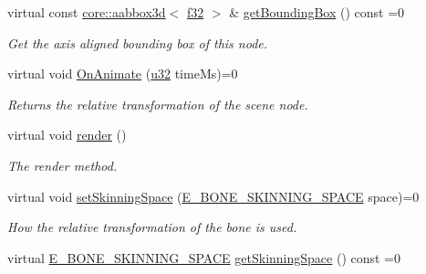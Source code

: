 \begin{DoxyCompactItemize}
\mbox{\label{classirr_1_1scene_1_1IBoneSceneNode_ac5d0a610b0a24a7501f29ad000d28b3b}} 
virtual const \hyperlink{classirr_1_1core_1_1aabbox3d}{core\+::aabbox3d}$<$ \hyperlink{namespaceirr_a0277be98d67dc26ff93b1a6a1d086b07}{f32} $>$ \& \hyperlink{classirr_1_1scene_1_1IBoneSceneNode_ac5d0a610b0a24a7501f29ad000d28b3b}{get\+Bounding\+Box} () const =0
\begin{DoxyCompactList}\small\item\em Get the axis aligned bounding box of this node. \end{DoxyCompactList}\item 
virtual void \hyperlink{classirr_1_1scene_1_1IBoneSceneNode_a7e21d0722e5b105e4d2a956bff110a7f}{On\+Animate} (\hyperlink{namespaceirr_a0416a53257075833e7002efd0a18e804}{u32} time\+Ms)=0
\begin{DoxyCompactList}\small\item\em Returns the relative transformation of the scene node. \end{DoxyCompactList}\item 
virtual void \hyperlink{classirr_1_1scene_1_1IBoneSceneNode_ac942248f09d2db69804ea47476e3829e}{render} ()
\begin{DoxyCompactList}\small\item\em The render method. \end{DoxyCompactList}\item 
\mbox{\label{classirr_1_1scene_1_1IBoneSceneNode_a071c9edb957b67f18c8285fe7670f9d4}} 
virtual void \hyperlink{classirr_1_1scene_1_1IBoneSceneNode_a071c9edb957b67f18c8285fe7670f9d4}{set\+Skinning\+Space} (\hyperlink{namespaceirr_1_1scene_a47bfc785c34c953f926c920cd13ba1fb}{E\+\_\+\+B\+O\+N\+E\+\_\+\+S\+K\+I\+N\+N\+I\+N\+G\+\_\+\+S\+P\+A\+CE} space)=0
\begin{DoxyCompactList}\small\item\em How the relative transformation of the bone is used. \end{DoxyCompactList}\item 
\mbox{\label{classirr_1_1scene_1_1IBoneSceneNode_aa41c118c8fa8741c6945787c50c42df7}} 
virtual \hyperlink{namespaceirr_1_1scene_a47bfc785c34c953f926c920cd13ba1fb}{E\+\_\+\+B\+O\+N\+E\+\_\+\+S\+K\+I\+N\+N\+I\+N\+G\+\_\+\+S\+P\+A\+CE} \hyperlink{classirr_1_1scene_1_1IBoneSceneNode_aa41c118c8fa8741c6945787c50c42df7}{get\+Skinning\+Space} () const =0

\end{DoxyCompactItemize}
